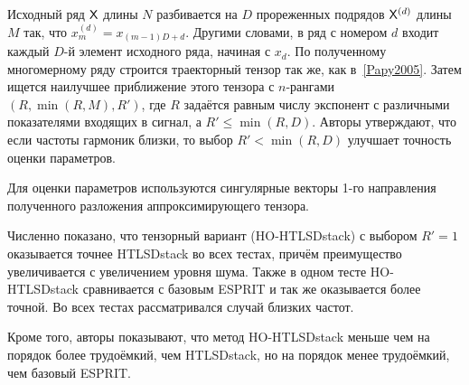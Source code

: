 \documentclass[12pt]{article}
\theoremstyle{plain}
\theoremstyle{definition}
\theoremstyle{remark}
\begin{document}
Исходный ряд $\mathsf{X}$ длины $N$ разбивается на $D$ прореженных
подрядов $\mathsf{X}^{(d)}$ длины $M$ так, что $x_m^{(d)}=x_{(m-1)D + d}$.
Другими словами, в ряд с номером $d$ входит каждый $D$-й элемент
исходного ряда, начиная с $x_d$.
По полученному многомерному ряду строится траекторный тензор так же,
как в~\ref{Papy2005}.
Затем ищется наилучшее приближение этого тензора с $n$-рангами
$(R,\min(R, M), R')$, где $R$ задаётся равным числу экспонент с
различными показателями входящих в сигнал, а $R' \leqslant \min(R, D)$.
Авторы утверждают, что если частоты гармоник близки, то выбор $R' < \min(R, D)$
улучшает точность оценки параметров.

Для оценки параметров используются сингулярные векторы 1-го
направления полученного разложения аппроксимирующего тензора.

Численно показано, что тензорный вариант (HO-HTLSDstack) с выбором
$R'=1$ оказывается точнее HTLSDstack во всех тестах, причём
преимущество увеличивается с увеличением уровня шума.
Также в одном тесте HO-HTLSDstack сравнивается с базовым ESPRIT и
так же оказывается более точной.
Во всех тестах рассматривался случай близких частот.

Кроме того, авторы показывают, что метод HO-HTLSDstack меньше чем на
порядок более трудоёмкий, чем HTLSDstack, но на порядок менее
трудоёмкий, чем базовый ESPRIT.
\end{document}
